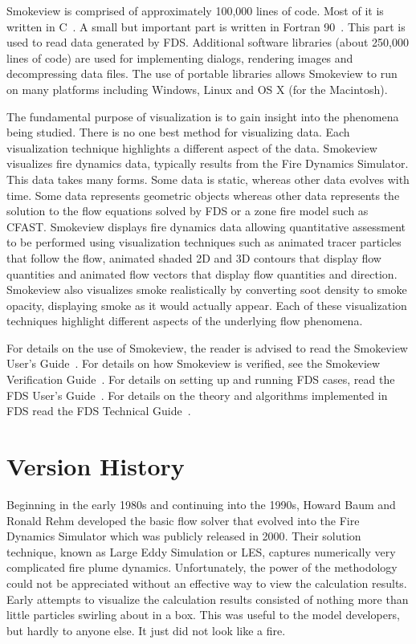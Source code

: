 \documentclass[11pt,twoside]{book}
\begin{document}
Smokeview is comprised of approximately 100,000 lines of code.
Most of it is written in C~\cite{C:book}. A small but important
part is written in Fortran 90~\cite{Fortran:book}.  This part is
used to read data generated by FDS.  Additional software libraries
(about 250,000 lines of code) are used for implementing dialogs,
rendering images and decompressing data files. The use of portable
libraries allows Smokeview to run on many platforms including
Windows, Linux and OS X (for the Macintosh).

The fundamental purpose of visualization is to gain insight into
the phenomena being studied. There is no one best method for
visualizing data. Each visualization technique highlights a
different aspect of the data. Smokeview visualizes fire dynamics
data, typically results from the Fire Dynamics Simulator. This
data takes many forms.  Some data is static, whereas other data
evolves with time. Some data represents geometric objects whereas
other data represents the solution to the flow equations solved by
FDS or a zone fire model such as CFAST. Smokeview displays fire
dynamics data allowing quantitative assessment to be performed
using visualization techniques such as animated tracer particles
that follow the flow, animated shaded 2D and 3D contours that
display flow quantities and animated flow vectors that display
flow quantities and direction. Smokeview also visualizes smoke
realistically by converting soot density to smoke opacity,
displaying smoke as it would actually appear. Each of these
visualization techniques highlight different aspects of the
underlying flow phenomena.

For details on the use of Smokeview, the reader is advised to read
the Smokeview User's Guide~\cite{Smokeview_Users_Guide}. For
details on how Smokeview is verified, see the Smokeview
Verification Guide~\cite{Smokeview_Verification_Guide}.  For
details on setting up and running FDS cases, read the FDS User's
Guide~\cite{FDS_Users_Guide}.  For details on the theory and
algorithms implemented in FDS read the FDS Technical
Guide~\cite{FDS_Tech_Guide}.

%
%

\section{Version History}

Beginning in the early 1980s and continuing into the 1990s, Howard
Baum and Ronald Rehm developed the basic flow solver that evolved
into the Fire Dynamics Simulator which was publicly released in
2000\cite{McGrattan:6}.  Their solution technique, known as Large
Eddy Simulation or LES, captures numerically very complicated fire
plume dynamics.  Unfortunately, the power of the methodology could
not be appreciated without an effective way to view the
calculation results.  Early attempts to visualize the calculation
results consisted of nothing more than little particles swirling
about in a box.  This was useful to the model developers, but
hardly to anyone else.  It just did not look like a fire.
\end{document}
